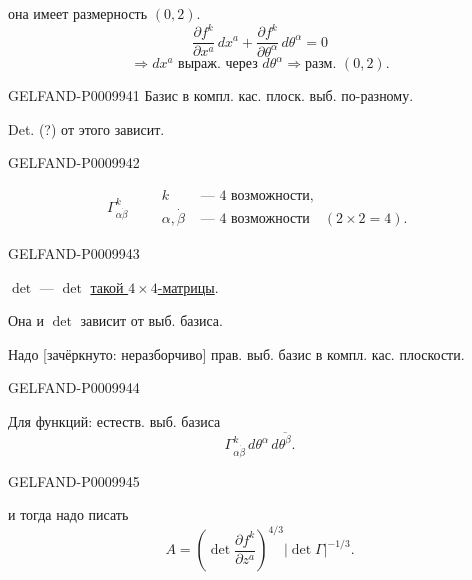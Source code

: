 она имеет размерность $(0,2)$.
\[
\frac{\partial f^k}{\partial x^a}\,dx^a+
\frac{\partial f^k}{\partial\theta^\alpha}\,d\theta^\alpha=0
\]
\[
\Rightarrow dx^a\text{ выраж. через }d\theta^\alpha
\Rightarrow \text{разм. }(0,2).
\]


\begin{GelfandAdjacentEvidence}{GELFAND-P000994}{1}
Базис в компл. кас. плоск. выб. по-разному.

Det. (?) от этого зависит.
\end{GelfandAdjacentEvidence}
\begin{GelfandAdjacentEvidence}{GELFAND-P000994}{2}

\[
\Gamma^k_{\alpha\dot\beta}
\qquad
\begin{aligned}
k&\text{ --- 4 возможности},\\
\alpha,\dot\beta&\text{ --- 4 возможности}\quad(2\times2=4).
\end{aligned}
\]
\end{GelfandAdjacentEvidence}
\begin{GelfandAdjacentEvidence}{GELFAND-P000994}{3}

\underline{\underline{$\det$}} --- $\det$ \underline{такой $4\times4$-матрицы}.

Она и $\det$ зависит от выб. базиса.

Надо [зачёркнуто: неразборчиво] прав. выб. базис в компл. кас. плоскости.
\end{GelfandAdjacentEvidence}
\begin{GelfandAdjacentEvidence}{GELFAND-P000994}{4}


Для функций: естеств. выб. базиса
\[
\Gamma^k_{\alpha\dot\beta}\,d\theta^\alpha\,d\overline{\theta^\beta}.
\]
\end{GelfandAdjacentEvidence}
\begin{GelfandAdjacentEvidence}{GELFAND-P000994}{5}


и тогда надо писать
\[
A=\left(\det\frac{\partial f^k}{\partial z^a}\right)^{4/3}
|\det\Gamma|^{-1/3}.
\]
\end{GelfandAdjacentEvidence}
